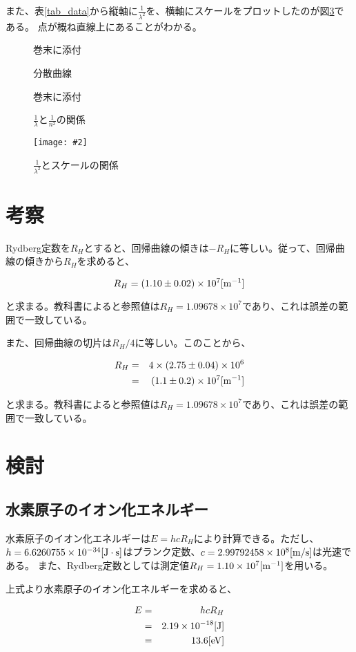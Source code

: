 \documentclass[uplatex,11pt]{jsarticle}
\newcommand{\fg}[3]{ %
    \begin{figure}
        \begin{center}
            \texttt{[image: \#2]}
            \caption{#3}
            \label{fg_#1}
        \end{center}
    \end{figure}
}
\newcommand{\dummyfig}[2]{
    \begin{figure}
        \begin{center}
            \begin{shadebox}
                巻末に添付
            \end{shadebox}
            \caption{#2}
            \label{fg_#1}
        \end{center}
    \end{figure}
}
\newcommand{\fr}[1]{図\ref{fg_#1}}
\newcommand{\tr}[1]{表\ref{tab_#1}}
\begin{document}
また、\tr{data}から縦軸に$\frac{1}{\lambda^2}$を、横軸にスケールをプロットしたのが\fr{lambda-inverse}である。
点が概ね直線上にあることがわかる。

\dummyfig{bunsan}{分散曲線}
\dummyfig{n-lambda}{$\frac{1}{\lambda}$と$\frac{1}{n^2}$の関係}
\fg{lambda-inverse}{graph/lambda_square.png}{$\frac{1}{\lambda^2}$とスケールの関係}

\section{考察}

Rydberg定数を$R_H$とすると、回帰曲線の傾きは$-R_H$に等しい。従って、回帰曲線の傾きから$R_H$を求めると、

\[
    R_H = (1.10 \pm 0.02) \times 10^7 [{\rm m^{-1}}]
\]

と求まる。教科書によると参照値は$R_H = 1.09678 \times 10^7$であり、これは誤差の範囲で一致している。

また、回帰曲線の切片は$R_H/4$に等しい。このことから、

\begin{eqnarray*}
    R_H & = & 4 \times (2.75 \pm 0.04) \times 10^6 \\
        & = & (1.1 \pm 0.2) \times 10^7 [{\rm m^{-1}}]
\end{eqnarray*}

と求まる。教科書によると参照値は$R_H = 1.09678 \times 10^7$であり、これは誤差の範囲で一致している。

\section{検討}

\subsection{水素原子のイオン化エネルギー}

水素原子のイオン化エネルギーは$E = hcR_H$により計算できる。ただし、$h=6.6260755 \times 10^{-34}[{\rm J\cdot s}]$はプランク定数、$c=2.99792458 \times 10^8[{\rm m/s}]$は光速である。
また、Rydberg定数としては測定値$R_H = 1.10\times 10^7[{\rm m^{-1}}]$を用いる。

上式より水素原子のイオン化エネルギーを求めると、

\begin{eqnarray*}
    E & = & hcR_H \\
      & = & 2.19 \times 10^{-18} [{\rm J}] \\
      & = & 13.6 [{\rm eV}]
\end{eqnarray*}
\end{document}
